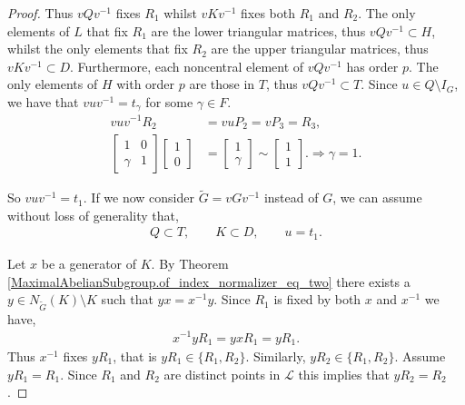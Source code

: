 \begin{proof}
Thus $vQv^{-1}$ fixes $R_1$ whilst $vKv^{-1}$ fixes both $R_1$ and $R_2$. The only elements of $L$ that fix $R_1$ are the lower triangular matrices, thus  $vQv^{-1} \subset H$, whilst the only elements that fix $R_2$ are the upper triangular matrices, thus $vKv^{-1} \subset D$. Furthermore, each noncentral element of $vQv^{-1}$ has order $p$. The only elements of $H$ with order $p$ are those in $T$, thus $vQv^{-1} \subset T$. Since $u \in Q \setminus I_G$, we have that $v u v^{-1} = t_\gamma$ for some $\gamma \in F$.
\begin{align*} v u v^{-1}R_2 &= v u P_2 = v P_3 = R_3,
\\[1.5ex] \begin{bmatrix} 1 & 0\\ \gamma & 1 \end{bmatrix} \begin{bmatrix} 1 \\ 0 \end{bmatrix} &= \begin{bmatrix} 1 \\ \gamma  \end{bmatrix} \sim \begin{bmatrix} 1 \\ 1 \end{bmatrix}. \Longrightarrow \gamma = 1.
\end{align*}

So $v u v^{-1} = t_1$. If we now consider $\widetilde{G} = vGv^{-1}$ instead of $G$, we can assume without loss of generality that,
\begin{align*} Q \subset T, \qquad K \subset D, \qquad u = t_1.
\end{align*}

Let $x$ be a generator of $K$. By Theorem \ref{MaximalAbelianSubgroup.of_index_normalizer_eq_two} there exists a $y \in N_{\widetilde{G}}(K) \! \setminus \! K$ such that $y x = x^{-1} y$. Since $R_1$ is fixed by both $x$ and $x^{-1}$ we have,
\begin{align*} x^{-1} y R_1 =  y x R_1 = y R_1.
\end{align*}
Thus $x^{-1}$ fixes $y R_1$, that is $y R_1 \in \{ R_1, R_2 \}$. Similarly, $y R_2 \in \{ R_1, R_2 \}$. Assume $y R_1 = R_1$. Since $R_1$ and $R_2$ are distinct points in $\mathscr{L}$ this implies that $y R_2 = R_2$.


\end{proof}
